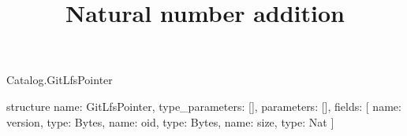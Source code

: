 \begin{lexlean}{Catalog.GitLfsPointer}
\title{Natural number addition}
\begin{semanticmodule}
structure{
  name: GitLfsPointer,
  type_parameters: [],
  parameters: [],
  fields: [
    {name: version, type: Bytes},
    {name: oid, type: Bytes},
    {name: size, type: Nat}
  ]
}
\end{semanticmodule}
\end{lexlean}
